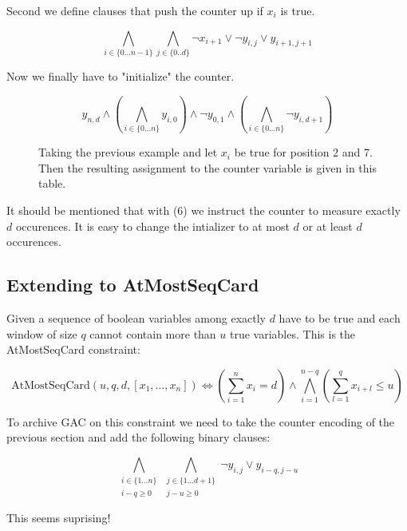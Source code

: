 \documentclass[]{llncs}
\begin{document}
Second we define clauses that push  the counter up if $x_i$ is true. 

\begin{equation}
    \bigwedge_{i \in \{0\ldots n-1\}} \bigwedge_{j\in\{0..d\}}
    \neg x_{i+1} \vee \neg y_{i,j} \vee y_{i+1,j+1}
\end{equation}

Now we finally have to "initialize" the counter. 

\begin{equation}
y_{n,d} \wedge \left (\bigwedge_{i\in\{0\ldots n\}} y_{i,0} \right )\wedge \neg
    y_{0,1} \wedge \left(\bigwedge_{i\in\{0\ldots n\}} \neg
        y_{i,d+1}\right )
\end{equation}


\begin{figure}
\centering 
\caption{Taking the previous example and let $x_{i}$ be true for
    position 2 and 7. Then the resulting assignment to the counter
    variable is given in this table. }
%
\end{figure}

It should be mentioned that with (6) we instruct the counter to measure
exactly $d$ occurences. It is easy to change the intializer to at most
$d$ or at least $d$ occurences. 

\subsection{Extending to AtMostSeqCard}

Given a sequence of boolean variables among exactly $d$ have to be true
and each window of size $q$ cannot contain more than $u$ true variables.
This is the AtMostSeqCard constraint: 

$$ \text{AtMostSeqCard}(u,q,d,[x_{1},\ldots,x_{n}]) \iff (\sum_{i=1}^n
x_{i} = d) \wedge \bigwedge_{i=1}^{n-q}(\sum_{l=1}^q x_{i+l} \leq u )$$

To archive GAC on this constraint we need to take the counter encoding
of the previous section and add the following binary clauses:

\begin{equation}
    \bigwedge_{\substack{i \in \{1 \ldots n\} \\ i-q \geq 0}}
    \bigwedge_{\substack{j\in\{1\ldots d+1\}\\ j-u \geq 0}}
    \neg y_{i,j} \vee y_{i-q,j-u}
\end{equation}               

This seems suprising! 
\end{document}
